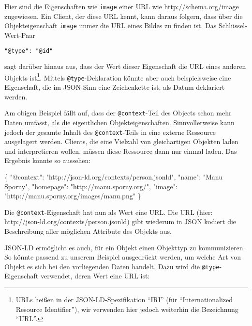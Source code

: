 \documentclass[,a4paper]{article}
\newenvironment{Shaded}{}{}
\newcommand{\DataTypeTok}[1]{\textcolor[rgb]{0.56,0.13,0.00}{{#1}}}
\newcommand{\StringTok}[1]{\textcolor[rgb]{0.25,0.44,0.63}{{#1}}}
\newcommand{\NormalTok}[1]{{#1}}
\begin{document}
Hier sind die Eigenschaften wie \texttt{image} einer URL wie
http://schema.org/image zugewiesen. Ein Client, der diese URL kennt,
kann daraus folgern, dass über die Objekteigenschaft \texttt{image}
immer die URL eines Bildes zu finden ist. Das Schlüssel-Wert-Paar

\begin{verbatim}
"@type": "@id"
\end{verbatim}

sagt darüber hinaus aus, dass der Wert dieser Eigenschaft die URL eines
anderen Objekts ist\footnote{URLs heißen in der JSON-LD-Spezifikation
  ``IRI'' (für ``Internationalized Resource Identifier''), wir verwenden
  hier jedoch weiterhin die Bezeichnung ``URL''.}. Mittels
\texttt{@type}-Deklaration könnte aber auch beispielsweise eine
Eigenschaft, die im JSON-Sinn eine Zeichenkette ist, als Datum
deklariert werden.

Am obigen Beispiel fällt auf, dass der \texttt{@context}-Teil des
Objects schon mehr Daten umfasst, als die eigentlichen
Objekteigenschaften. Sinnvollerweise kann jedoch der gesamte Inhalt des
\texttt{@context}-Teils in eine externe Ressource ausgelagert werden.
Clients, die eine Vielzahl von gleichartigen Objekten laden und
interpretieren wollen, müssen diese Ressource dann nur einmal laden. Das
Ergebnis könnte so aussehen:

\begin{Shaded}
\begin{Highlighting}[]
\NormalTok{\{}
  \DataTypeTok{"@context"}\NormalTok{: }\StringTok{"http://json-ld.org/contexts/person.jsonld"}\NormalTok{,}
  \DataTypeTok{"name"}\NormalTok{: }\StringTok{"Manu Sporny"}\NormalTok{,}
  \DataTypeTok{"homepage"}\NormalTok{: }\StringTok{"http://manu.sporny.org/"}\NormalTok{,}
  \DataTypeTok{"image"}\NormalTok{: }\StringTok{"http://manu.sporny.org/images/manu.png"}
\NormalTok{\}}
\end{Highlighting}
\end{Shaded}

Die \texttt{@context}-Eigenschaft hat nun als Wert eine URL. Die URL
(hier: http://json-ld.org/contexts/person.jsonld) gibt wiederum in JSON
kodiert die Beschreibung aller möglichen Attribute des Objekts aus.

JSON-LD ermöglicht es auch, für ein Objekt einen Objekttyp zu
kommunizieren. So könnte passend zu unserem Beispiel ausgedrückt werden,
um welche Art von Objekt es sich bei den vorliegenden Daten handelt.
Dazu wird die \texttt{@type}-Eigenschaft verwendet, deren Wert eine URL
ist:
\end{document}
